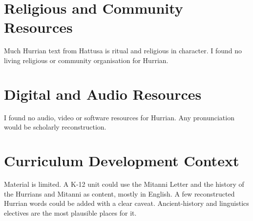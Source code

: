 \documentclass[12pt]{article}
\begin{document}
\section{Religious and Community Resources}
Much Hurrian text from Hattusa is ritual and religious in character. I found no living religious or community organisation for Hurrian.

\section{Digital and Audio Resources}
I found no audio, video or software resources for Hurrian. Any pronunciation would be scholarly reconstruction.

\section{Curriculum Development Context}
Material is limited. A K-12 unit could use the Mitanni Letter and the history of the Hurrians and Mitanni as content, mostly in English. A few reconstructed Hurrian words could be added with a clear caveat. Ancient-history and linguistics electives are the most plausible places for it.
\end{document}
